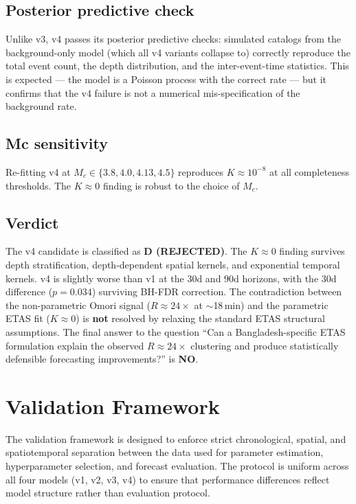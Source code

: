\documentclass[10pt,a4paper,twocolumn]{article}
\begin{document}
\subsection{Posterior predictive check}

Unlike v3, v4 passes its posterior predictive checks: simulated catalogs from the background-only model (which all v4 variants collapse to) correctly reproduce the total event count, the depth distribution, and the inter-event-time statistics. This is expected --- the model is a Poisson process with the correct rate --- but it confirms that the v4 failure is not a numerical mis-specification of the background rate.

\subsection{Mc sensitivity}

Re-fitting v4 at $M_c\in\{3.8, 4.0, 4.13, 4.5\}$ reproduces $K\approx10^{-8}$ at all completeness thresholds. The $K\approx0$ finding is robust to the choice of $M_c$.

\subsection{Verdict}

The v4 candidate is classified as \textbf{D (REJECTED)}. The $K\approx0$ finding survives depth stratification, depth-dependent spatial kernels, and exponential temporal kernels. v4 is slightly worse than v1 at the 30d and 90d horizons, with the 30d difference ($p=0.034$) surviving BH-FDR correction. The contradiction between the non-parametric Omori signal ($R\approx24\times$ at $\sim$18\,min) and the parametric ETAS fit ($K\approx0$) is \textbf{not} resolved by relaxing the standard ETAS structural assumptions. The final answer to the question ``Can a Bangladesh-specific ETAS formulation explain the observed $R\approx24\times$ clustering and produce statistically defensible forecasting improvements?'' is \textbf{NO}.

\section{Validation Framework}\label{sec:validation-framework}

The validation framework is designed to enforce strict chronological, spatial, and spatiotemporal separation between the data used for parameter estimation, hyperparameter selection, and forecast evaluation. The protocol is uniform across all four models (v1, v2, v3, v4) to ensure that performance differences reflect model structure rather than evaluation protocol.
\end{document}
